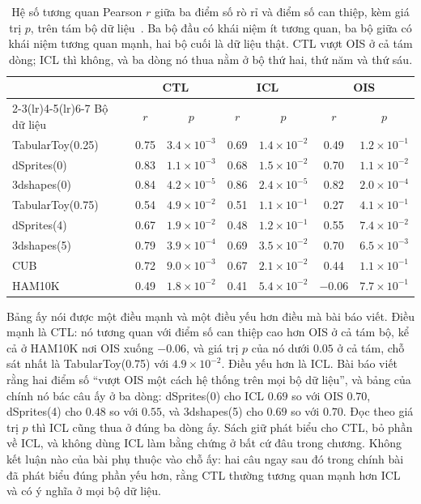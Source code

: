 \begin{table}[htbp]
  \centering
  \caption{Hệ số tương quan Pearson $r$ giữa ba điểm số rò rỉ và điểm số can thiệp,
  kèm giá trị $p$, trên tám bộ dữ liệu~\autocite{p30leakage}. Ba bộ đầu có khái
  niệm ít tương quan, ba bộ giữa có khái niệm tương quan mạnh, hai bộ cuối là dữ
  liệu thật. CTL vượt OIS ở cả tám dòng; ICL thì không, và ba dòng nó thua nằm ở
  bộ thứ hai, thứ năm và thứ sáu.}
  \label{tab:ch15-tuong-quan-diem-so}
  \begin{tabular}{@{}lcccccc@{}}
    \toprule
    & \multicolumn{2}{c}{CTL} & \multicolumn{2}{c}{ICL} & \multicolumn{2}{c}{OIS} \\
    \cmidrule(lr){2-3}\cmidrule(lr){4-5}\cmidrule(lr){6-7}
    Bộ dữ liệu & $r$ & $p$ & $r$ & $p$ & $r$ & $p$ \\
    \midrule
    TabularToy(0.25) & 0.75 & $3.4\times10^{-3}$ & 0.69 & $1.4\times10^{-2}$ & 0.49 & $1.2\times10^{-1}$ \\
    dSprites(0)      & 0.83 & $1.1\times10^{-3}$ & 0.68 & $1.5\times10^{-2}$ & 0.70 & $1.1\times10^{-2}$ \\
    3dshapes(0)      & 0.84 & $4.2\times10^{-5}$ & 0.86 & $2.4\times10^{-5}$ & 0.82 & $2.0\times10^{-4}$ \\
    \addlinespace
    TabularToy(0.75) & 0.54 & $4.9\times10^{-2}$ & 0.51 & $1.1\times10^{-1}$ & 0.27 & $4.1\times10^{-1}$ \\
    dSprites(4)      & 0.67 & $1.9\times10^{-2}$ & 0.48 & $1.2\times10^{-1}$ & 0.55 & $7.4\times10^{-2}$ \\
    3dshapes(5)      & 0.79 & $3.9\times10^{-4}$ & 0.69 & $3.5\times10^{-2}$ & 0.70 & $6.5\times10^{-3}$ \\
    \addlinespace
    CUB              & 0.72 & $9.0\times10^{-3}$ & 0.67 & $2.1\times10^{-2}$ & 0.44 & $1.1\times10^{-1}$ \\
    HAM10K           & 0.49 & $1.8\times10^{-2}$ & 0.41 & $5.4\times10^{-2}$ & $-0.06$ & $7.7\times10^{-1}$ \\
    \bottomrule
  \end{tabular}
\end{table}

%
Bảng ấy nói được một điều mạnh và một điều yếu hơn điều mà bài báo viết. Điều
mạnh là CTL: nó tương quan với điểm số can thiệp cao hơn OIS ở cả tám bộ, kể cả ở
HAM10K nơi OIS xuống $-0.06$, và giá trị $p$ của nó dưới $0.05$ ở cả tám, chỗ sát
nhất là TabularToy(0.75) với $4.9\times10^{-2}$. Điều yếu hơn là ICL. Bài báo
viết rằng hai điểm số \enquote{vượt OIS một cách hệ thống trên mọi bộ dữ liệu},
và bảng của chính nó bác câu ấy ở ba dòng: dSprites(0) cho ICL $0.69$ so với OIS
$0.70$, dSprites(4) cho $0.48$ so với $0.55$, và 3dshapes(5) cho $0.69$ so với
$0.70$. Đọc theo giá trị $p$ thì ICL cũng thua ở đúng ba dòng ấy. Sách giữ phát
biểu cho CTL, bỏ phần về ICL, và không dùng ICL làm bằng chứng ở bất cứ đâu
trong chương. Không kết luận nào của bài phụ thuộc vào chỗ ấy: hai câu ngay sau
đó trong chính bài đã phát biểu đúng phần yếu hơn, rằng CTL thường tương quan
mạnh hơn ICL và có ý nghĩa ở mọi bộ dữ liệu.

